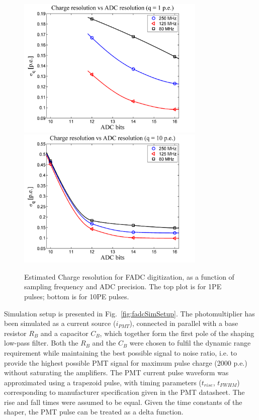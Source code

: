 \begin{figure}[htpb]
\centering
  \includegraphics[width=9cm]{figures/charge_vs_bits-dyn_2000pe-pls_1pe.png}
  \includegraphics[width=9cm]{figures/charge_vs_bits-dyn_2000pe-pls_10pe.png}
  \caption{Estimated Charge resolution for FADC digitization, as a function of sampling frequency and ADC precision.  The top plot is for 1PE pulses; bottom is for 10PE pulses.}
\label{fig:charge_vs_dyn}
\end{figure}


Simulation setup is presented in Fig.~\ref{fig:fadcSimSetup}. The photomultiplier has been simulated as a current source (\(i_{PMT}\)), connected in parallel with a base resistor \(R_{B}\)  and a capacitor \(C_{B}\), which together form the first pole of the shaping low-pass filter. Both the \(R_{B}\) and the \(C_{B}\) were chosen to fulfil the dynamic range requirement while maintaining the best possible signal to noise ratio,  i.e. to provide the highest possible PMT signal for maximum pulse charge (2000 p.e.) without saturating the amplifiers. The PMT current pulse waveform was approximated using a trapezoid pulse, with timing parameters (\(t_{rise}\), \(t_{FWHM}\)) corresponding to manufacturer specification given in the PMT datasheet. The rise and fall times were assumed to be equal. Given the time constants of the shaper, the PMT pulse can be treated as a delta function. 

